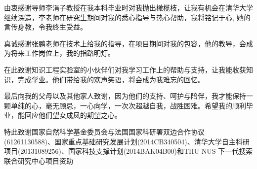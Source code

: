 \begin{acknowledgement}
  由衷感谢导师李涓子教授在我本科毕业时对我抛出橄榄枝，让我有机会在清华大学继续深造，李老师在研究生期间对我的悉心指导与热心帮助，我将铭记于心, 她的言传身教，令我终生受益。

  真诚感谢张鹏老师在技术上给我的指导，在项目期间对我的包容，他的教导，会成为将来工作岗位上，我的指路明灯。

  在此致谢知识工程实验室的小伙伴们对我学习工作上的帮助与支持，让我能收获知识，完成学业。他们带给我的欢声笑语，将会成为我难忘的回忆。

  最后向我的父母以及其他家人致谢，因为他们的支持、呵护与陪伴，我才能保持一颗单纯的心，毫无顾忌，一心向学，一次次超越自我，战胜困难。希望我的顺利毕业，能回应他们望女成凤的期望之心。


  特此致谢国家自然科学基金委员会与法国国家科研署双边合作协议(61261130588)、国家重点基础研究发展计划(2014CB340504)、清华大学自主科研项目(20131089256)、国家科技支撑计划(2014BAK04B00)和THU-NUS 下一代搜索联合研究中心项目资助

\end{acknowledgement}
